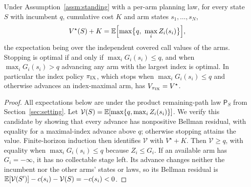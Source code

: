 \begin{theorem}\label{thm:index}
Under Assumption~\ref{assm:standing} with a per-arm planning law, for every state $S$
with incumbent $q$, cumulative cost $K$ and arm states $s_1,\ldots,s_N$,
\[
V^\star(S)+K=\mathbb{E}\Bigl[\max\bigl\{q,\ \max_i Z_i(s_i)\bigr\}\Bigr],
\]
the expectation being over the independent covered call values of the arms. Stopping is optimal if and
only if $\max_i G_i(s_i)\le q$, and when $\max_i G_i(s_i)>q$ advancing any arm with the largest
index is optimal. In particular the index policy $\pi_{\rm IX}$, which stops when
$\max_i G_i(s_i)\le q$ and otherwise advances an index-maximal arm, has $V_{\pi_{\rm IX}}=V^\star$.
\end{theorem}
\begin{proof}
All expectations below are under the product remaining-path law $\mathsf P_S$ from
Section~\ref{sec:setting}. Let $\mathcal V(S)=\mathbb{E}[\max\{q,\max_i Z_i(s_i)\}]$.
We verify this candidate by showing that every advance has nonpositive Bellman
residual, with equality for a maximal-index advance above $q$; otherwise stopping
attains the value. Finite-horizon induction then identifies $\mathcal V$ with $V^\star+K$.
Then $\mathcal V\ge q$, with equality when $\max_iG_i(s_i)\le q$ because $Z_i\le G_i$.
If an available arm has $G_i=-\infty$, it has no collectable stage left. Its advance changes
neither the incumbent nor the other arms' states or laws, so its Bellman residual is
$\mathbb{E}[\mathcal V(S')]-c(s_i)-\mathcal V(S)=-c(s_i)<0$.


\end{proof}
